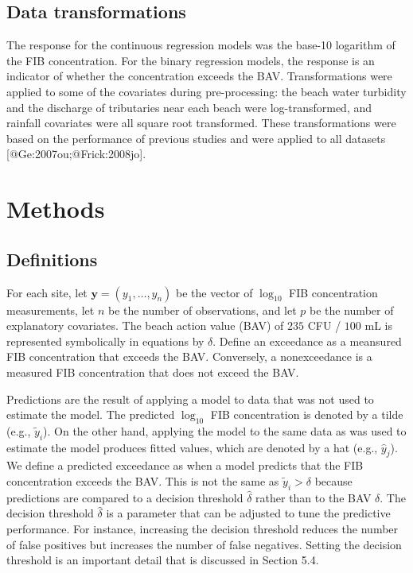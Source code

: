 \subsection{Data transformations}\label{data-transformations}

The response for the continuous regression models was the base-10
logarithm of the FIB concentration. For the binary regression models,
the response is an indicator of whether the concentration exceeds the
BAV. Transformations were applied to some of the covariates during
pre-processing: the beach water turbidity and the discharge of
tributaries near each beach were log-transformed, and rainfall
covariates were all square root transformed. These transformations were
based on the performance of previous studies and were applied to all
datasets {[}@Ge:2007ou;@Frick:2008jo{]}.

\section{Methods}\label{methods}

\subsection{Definitions}\label{definitions}

For each site, let \(\bm{y}=(y_1, \dots, y_n)\) be the vector of
\(\log_{10}\) FIB concentration measurements, let \(n\) be the number of
observations, and let \(p\) be the number of explanatory covariates. The
beach action value (BAV) of \(235\) CFU / \(100\) mL is represented
symbolically in equations by \(\delta\). Define an exceedance as a
meansured FIB concentration that exceeds the BAV. Conversely, a
nonexceedance is a measured FIB concentration that does not exceed the
BAV.

Predictions are the result of applying a model to data that was not used
to estimate the model. The predicted \(\log_{10}\) FIB concentration is
denoted by a tilde (e.g., \(\tilde{y}_i\)). On the other hand, applying
the model to the same data as was used to estimate the model produces
fitted values, which are denoted by a hat (e.g., \(\hat{y}_j\)). We
define a predicted exceedance as when a model predicts that the FIB
concentration exceeds the BAV. This is not the same as
\(\tilde{y}_i > \delta\) because predictions are compared to a decision
threshold \(\hat{\delta}\) rather than to the BAV \(\delta\). The
decision threshold \(\hat{\delta}\) is a parameter that can be adjusted
to tune the predictive performance. For instance, increasing the
decision threshold reduces the number of false positives but increases
the number of false negatives. Setting the decision threshold is an
important detail that is discussed in Section 5.4.


